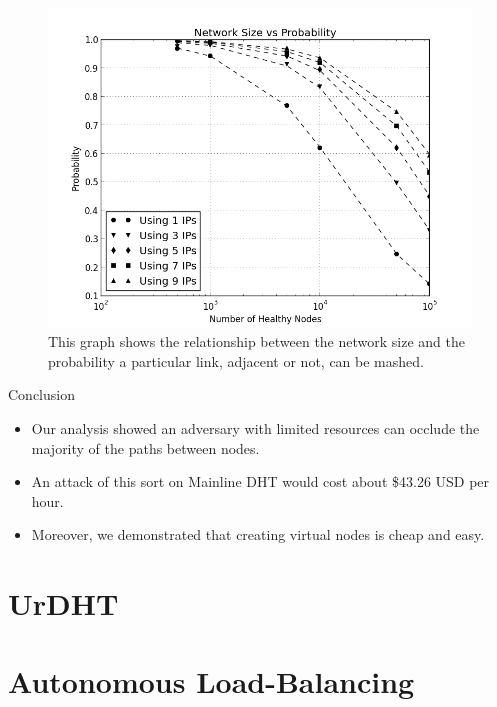 \documentclass[11pt]{beamer}
\begin{document}
\begin{frame}
    \begin{figure}
        \centering
        \includegraphics[width=0.7\linewidth]{figs/size_occlusion_chord}
        \caption{This graph shows the relationship between the network size and the probability a particular link, adjacent or not, can be mashed.}
        \label{fig:exp3}
    \end{figure}
\end{frame}
    
    
\begin{frame}{Conclusion}
	\begin{itemize}
		
		\item Our analysis showed an adversary with limited resources can occlude the majority of the paths between nodes.
		\item An attack of this sort on Mainline DHT would cost about \$43.26 USD per hour.
		\item Moreover, we demonstrated that creating virtual nodes is cheap and easy.
	\end{itemize}
\end{frame}




\section{UrDHT}

\section{Autonomous Load-Balancing}
\end{document}
